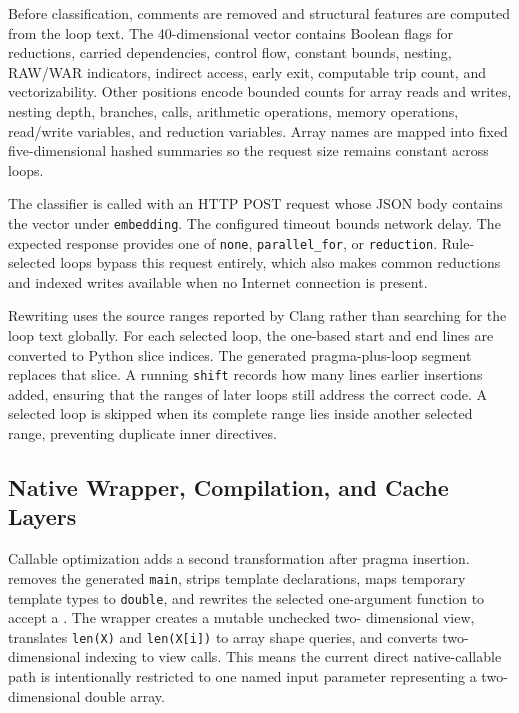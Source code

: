 Before classification, comments are removed and structural features are
computed from the loop text. The 40-dimensional vector contains Boolean flags
for reductions, carried dependencies, control flow, constant bounds, nesting,
RAW/WAR indicators, indirect access, early exit, computable trip count, and
vectorizability. Other positions encode bounded counts for array reads and
writes, nesting depth, branches, calls, arithmetic operations, memory
operations, read/write variables, and reduction variables. Array names are
mapped into fixed five-dimensional hashed summaries so the request size remains
constant across loops.

The classifier is called with an HTTP POST request whose JSON body contains the
vector under \texttt{embedding}. The configured timeout bounds network delay.
The expected response provides one of \texttt{none},
\texttt{parallel\_for}, or \texttt{reduction}. Rule-selected loops bypass this
request entirely, which also makes common reductions and indexed writes
available when no Internet connection is present.

Rewriting uses the source ranges reported by Clang rather than searching for the
loop text globally. For each selected loop, the one-based start and end lines are
converted to Python slice indices. The generated pragma-plus-loop segment
replaces that slice. A running \texttt{shift} records how many lines earlier
insertions added, ensuring that the ranges of later loops still address the
correct code. A selected loop is skipped when its complete range lies inside
another selected range, preventing duplicate inner directives.

\subsection{Native Wrapper, Compilation, and Cache Layers}

Callable optimization adds a second transformation after pragma insertion.
 removes the generated \texttt{main}, strips
template declarations, maps temporary template types to \texttt{double}, and
rewrites the selected one-argument function to accept a
. The wrapper creates a mutable unchecked two-
dimensional view, translates \texttt{len(X)} and \texttt{len(X[i])} to array
shape queries, and converts two-dimensional indexing to view calls. This means
the current direct native-callable path is intentionally restricted to one
named input parameter representing a two-dimensional double array.

